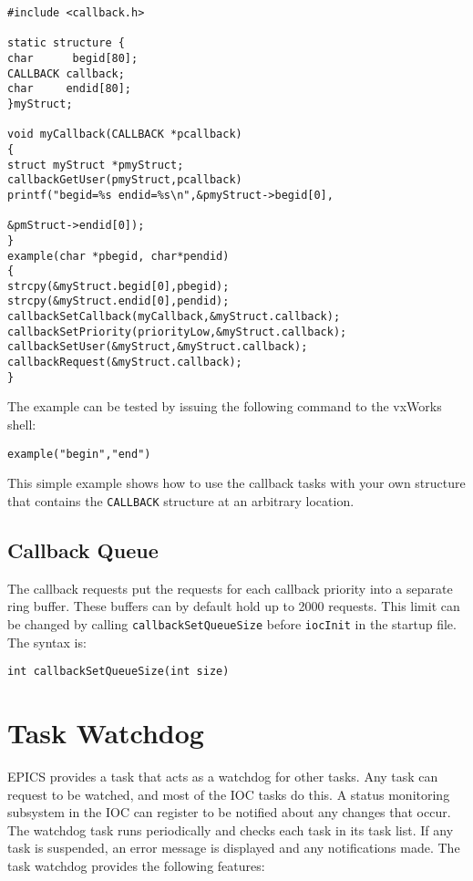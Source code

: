 \begin{verbatim}#include <callback.h>

static structure {
char      begid[80];
CALLBACK callback;
char     endid[80];
}myStruct;

void myCallback(CALLBACK *pcallback)
{
struct myStruct *pmyStruct;
callbackGetUser(pmyStruct,pcallback)
printf("begid=%s endid=%s\n",&pmyStruct->begid[0],

&pmStruct->endid[0]);
}
example(char *pbegid, char*pendid)
{
strcpy(&myStruct.begid[0],pbegid);
strcpy(&myStruct.endid[0],pendid);
callbackSetCallback(myCallback,&myStruct.callback);
callbackSetPriority(priorityLow,&myStruct.callback);
callbackSetUser(&myStruct,&myStruct.callback);
callbackRequest(&myStruct.callback);
}
\end{verbatim}The example can be tested by issuing the following command to the vxWorks shell:

\begin{verbatim}example("begin","end")
\end{verbatim}This simple example shows how to use the callback tasks with your own structure that contains the \verb|CALLBACK| structure 
at an arbitrary location.

\subsection{Callback Queue}

The callback requests put the requests for each callback priority into a separate ring buffer. These buffers can by default 
hold up to 2000 requests. This limit can be changed by calling \verb|callbackSetQueueSize| before \verb|iocInit| in the 
startup file. The syntax is:

\begin{verbatim}int callbackSetQueueSize(int size)
\end{verbatim}\section{Task Watchdog}

EPICS provides a task that acts as a watchdog for other tasks. Any task can request to be watched, and most of the IOC 
tasks do this. A status monitoring subsystem in the IOC can register to be notified about any changes that occur. The 
watchdog task runs periodically and checks each task in its task list. If any task is suspended, an error message is 
displayed and any notifications made. The task watchdog provides the following features:

